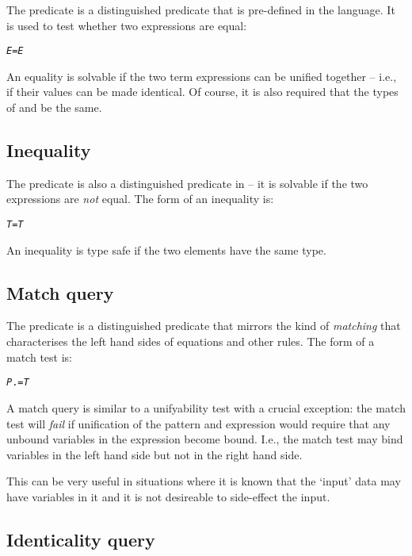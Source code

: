 The \q{=} predicate is a distinguished predicate that is pre-defined in the language. It is used to test whether two expressions are equal:
\begin{alltt}
\emph{E} = \emph{E}
\end{alltt}
An equality is solvable if the two term expressions can be unified together -- i.e., if their values can be made identical. Of course, it is also required that the types of  and  be the same.

\subsection{Inequality}
\label{goal:notequality}

The \q{\bsl=} predicate is also a distinguished predicate in \go -- it is solvable if the two expressions are \emph{not} equal. The form of an inequality is:
\begin{alltt}
\emph{T} \bsl= \emph{T}
\end{alltt}
An inequality is type safe if the two elements have the same type.

\subsection{Match query}
\label{goal:match}

The  predicate is a distinguished predicate that mirrors the kind of \emph{matching} that characterises the left hand sides of equations and other rules. The form of a match test is:
\begin{alltt}
\emph{P} .= \emph{T}
\end{alltt}
A match query is similar to a unifyability test with a crucial exception: the match test will \emph{fail} if unification of the pattern and expression would require that any unbound variables in the expression become bound. I.e., the match test may bind variables in the left hand side but not in the right hand side.

This can be very useful in situations where it is known that the `input' data may have variables in it and it is not desireable to side-effect the input.

\subsection{Identicality query}
\label{goal:identical}

